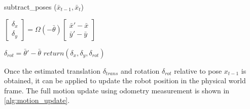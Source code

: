 \begin{algorithm}                      
  \caption{subtract\_poses ($\bar{x}_{t-1}, \bar{x}_{t}$)}         %
  \label{alg:substract poses}                           
  \begin{algorithmic}[1]  
    \State $\begin{bmatrix}
      \delta_{x}\\ 
      \delta_{y}
    \end{bmatrix}
    =
    \Omega(-\bar{\theta})
    \begin{bmatrix}
      \bar{x}' - \bar{x}\\ 
      \bar{y}' - \bar{y}
    \end{bmatrix}$

    \State $\delta_{rot} = \bar{\theta}' - \bar{\theta}$
    \State $return (\delta_{x}, \delta_{y}, \delta_{rot})$

  \end{algorithmic}
\end{algorithm}

Once the estimated translation $\delta_{trans}$ and rotation $\delta_{rot}$ relative to pose $x_{t-1}$ is obtained, it can be applied to update the robot position in the physical world frame. The full motion update using odometry measurement is shown in \autoref{alg:motion_update}.

\newcommand{\transfunc}{odometry\_motion\_update}

